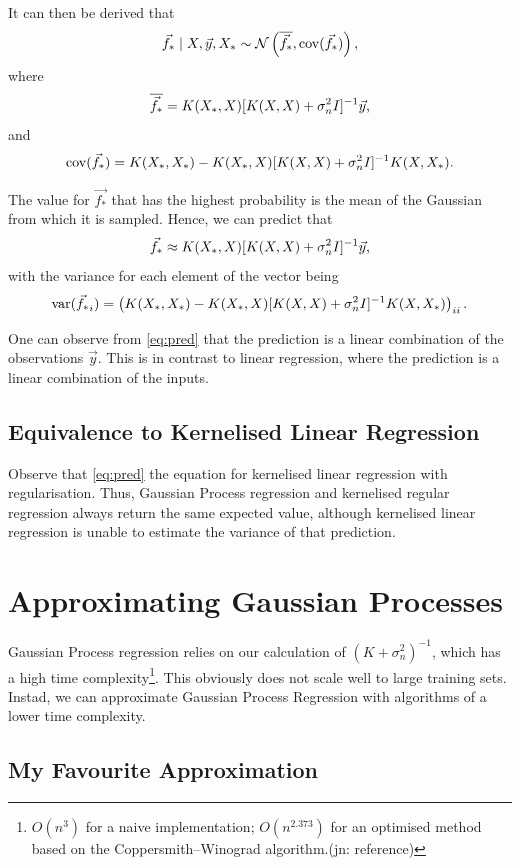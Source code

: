\documentclass[11pt,twoside]{report}
\newcommand\cN{\mathcal{N}}
\DeclareMathOperator{\var}{var}
\DeclareMathOperator{\cov}{cov}
\newcommand\jn[1]{{\color{red}(jn: #1)}}
\begin{document}
It can then be derived that \[
    \vec{f_*} \mid X, \vec{y}, X_* \sim \cN\left(\overline{\vec{f_*}}, \cov(\vec{f_*})\right)\text,
\] where \[
    \overline{\vec{f_*}} = K(X_*, X)[K(X, X) + \sigma_n^2I]^{-1}\vec{y}\text,
\] and \[
    \cov(\vec{f_*}) = K(X_*, X_*) - K(X_*, X)[K(X, X) + \sigma_n^2I]^{-1}K(X, X_*)\text.
\]

The value for $\vec{f_*}$ that has the highest probability is the mean of the Gaussian from which it is sampled. Hence, we can predict that \begin{equation}
    \label{eq:pred}
    \vec{f_*} \approx K(X_*, X)[K(X, X) + \sigma_n^2I]^{-1}\vec{y}\text,
\end{equation} with the variance for each element of the vector being\[
    \var(\vec{f_*}_i) = \left( K(X_*, X_*) - K(X_*, X)[K(X, X) + \sigma_n^2I]^{-1}K(X, X_*) \right)_{ii}\text.
\]

One can observe from \cref{eq:pred} that the prediction is a linear combination of the observations $\vec{y}$. This is in contrast to linear regression, where the prediction is a linear combination of the inputs.

\subsection{Equivalence to Kernelised Linear Regression}

Observe that \cref{eq:pred} the equation for kernelised linear regression with regularisation. Thus, Gaussian Process regression and kernelised regular regression always return the same expected value, although kernelised linear regression is unable to estimate the variance of that prediction.

\section{Approximating Gaussian Processes}

Gaussian Process regression relies on our calculation of $(K+\sigma_n^2)^{-1}$, which has a high time complexity\footnote{$O(n^3)$ for a naive implementation; $O(n^{2.373})$ for an optimised method based on the Coppersmith–Winograd algorithm.\jn{reference}}. This obviously does not scale well to large training sets. Instad, we can approximate Gaussian Process Regression with algorithms of a lower time complexity.

\subsection{My Favourite Approximation}
\end{document}
